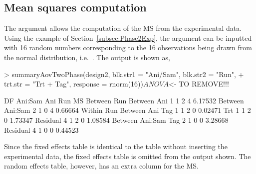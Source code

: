 \documentclass[article]{jss}
\begin{document}
\subsection{Mean squares computation}
The argument  allows the computation of the MS from the experimental data. Using the example of Section~\ref{subsec:Phase2Exp}, the  argument can be inputted with 16 random numbers corresponding to the 16 observations being drawn from the normal distribution, i.e.\ . The output is shown as,
\begin{CodeChunk}
\begin{CodeInput} 
> summaryAovTwoPhase(design2, blk.str1 = "Ani/Sam", blk.str2 = "Run", 
+  trt.str = "Trt + Tag", response = rnorm(16))$ANOVA
$<- TO REMOVE!!!
\end{CodeInput}
\begin{CodeOutput} 
                   DF Ani:Sam Ani Run MS     
Between Run                                  
   Between Ani     1  1       2   4   6.17532
   Between Ani:Sam 2  1       0   4   0.66664
Within Run                                   
   Between Ani                               
      Tag          1  1       2   0   0.02471
      Trt          1  1       2   0   1.73347
      Residual     4  1       2   0   1.08584
   Between Ani:Sam                           
      Tag          2  1       0   0   3.28668
      Residual     4  1       0   0   0.44523
\end{CodeOutput}
\end{CodeChunk}  
Since the fixed effects table is identical to the table without inserting the experimental data, the fixed effects table is omitted from the output shown. The random effects table, however, has an extra column for the MS.
\end{document}
